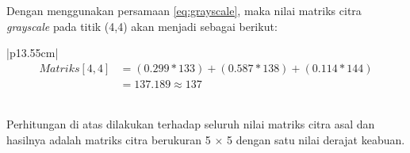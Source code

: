 \noindent Dengan menggunakan persamaan \ref{eq:grayscale}, maka nilai matriks citra \textit{grayscale} pada titik (4,4) akan menjadi sebagai berikut:
\begin{table}[H]
	\begin{adjustbox}{width=1\textwidth}
		\begin{tabular}{|p{13.55cm}|}
			\hline
			\begin{equation}\nonumber
			\begin{aligned}
			Matriks[4,4] &= (0.299 * 133) + (0.587 * 138) + (0.114 * 144) \\
						 &= 137.189 \approx 137 
			\end{aligned}
			\end{equation}\\
			\hline
		\end{tabular}
	\end{adjustbox}
\end{table}
\noindent Perhitungan di atas dilakukan terhadap seluruh nilai matriks citra asal dan hasilnya adalah matriks citra berukuran 5 $\times$ 5 dengan satu nilai derajat keabuan.

\begin{adjustbox}{width=1\textwidth}
	\noindent\begin{minipage}{\linewidth}
		\label{fig:MatriksCitraGrayscale}
	\end{minipage}
\end{adjustbox} \\

